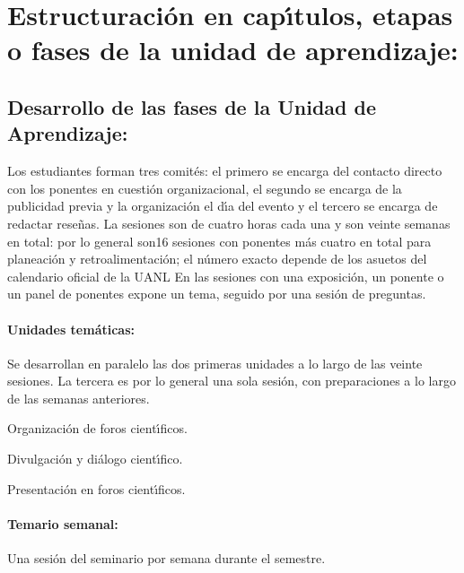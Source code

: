 \section{Estructuraci\'{o}n en cap\'{\i}tulos, etapas o fases de la unidad de
  aprendizaje:}

\subsection{Desarrollo de las fases de la Unidad de Aprendizaje:}

\quad

Los estudiantes forman tres comit\'{e}s: el primero se encarga del
contacto directo con los ponentes en cuesti\'{o}n organizacional, el
segundo se encarga de la publicidad previa y la organizaci\'{o}n el
d\'{\i}a del evento y el tercero se encarga de redactar rese\~{n}as.
La sesiones son de cuatro horas cada una y son veinte semanas en
total: por lo general son16 sesiones con ponentes m\'{a}s cuatro en
total para planeaci\'{o}n y retroalimentaci\'{o}n; el n\'{u}mero exacto
depende de los asuetos del calendario oficial de la UANL En las
sesiones con una exposici\'{o}n, un ponente o un panel de ponentes
expone un tema, seguido por una sesi\'{o}n de preguntas.

\paragraph{Unidades tem\'{a}ticas:}

\quad

Se desarrollan en paralelo las dos primeras unidades a lo largo de las
veinte sesiones. La tercera es por lo general una sola sesi\'{o}n, con
preparaciones a lo largo de las semanas anteriores.

\begin{description}[itemsep=-2pt]
\item[U1]{Organizaci\'{o}n de foros cient\'{\i}ficos.}
\item[U2]{Divulgaci\'{o}n y di\'{a}logo cient\'{\i}fico.}
\item[U3]{Presentaci\'{o}n en foros cient\'{\i}ficos.}
\end{description}

\paragraph{Temario semanal:}

\quad

Una sesi\'{o}n del seminario por semana durante el semestre.

